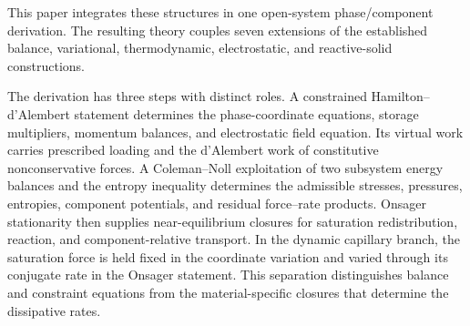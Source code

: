 This paper integrates these structures in one open-system phase/component
derivation.  The resulting theory couples seven extensions of the established
balance, variational, thermodynamic, electrostatic, and reactive-solid
constructions.

The derivation has three steps with distinct roles.  A constrained
Hamilton--d'Alembert statement determines the phase-coordinate equations,
storage multipliers, momentum balances, and electrostatic field equation.  Its
virtual work carries prescribed loading and the d'Alembert work of constitutive
nonconservative forces.  A Coleman--Noll exploitation of two subsystem energy
balances and the entropy inequality determines the admissible stresses,
pressures, entropies, component potentials, and residual force--rate products.
Onsager stationarity then supplies near-equilibrium closures for saturation
redistribution, reaction, and component-relative transport.  In the dynamic
capillary branch, the saturation force is held fixed in the coordinate
variation and varied through its conjugate rate in the Onsager statement.  This
separation distinguishes balance and constraint equations from the
material-specific closures that determine the dissipative rates.

